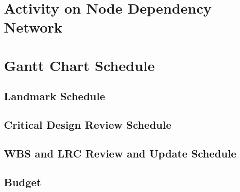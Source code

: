 \section{Activity on Node Dependency Network}
\section{Gantt Chart Schedule}
\subsection{Landmark Schedule}
\subsection{Critical Design Review Schedule}
\subsection{WBS and LRC Review and Update Schedule}
\subsection{Budget}
